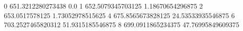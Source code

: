 0 651.3212280273438 0.0
1 652.5079345703125 1.18670654296875
2 653.0517578125 1.73052978515625
4 675.8565673828125 24.53533935546875
6 703.2527465820312 51.9315185546875
8 699.0911865234375 47.76995849609375
